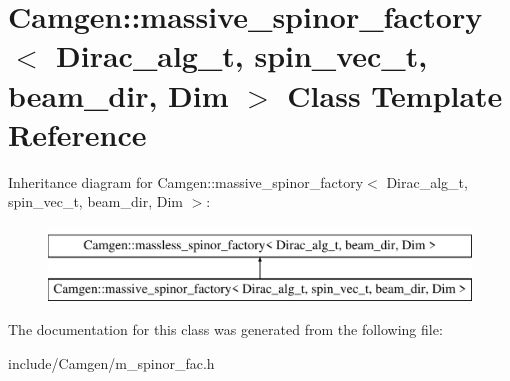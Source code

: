 \hypertarget{a00343}{\section{Camgen\-:\-:massive\-\_\-spinor\-\_\-factory$<$ Dirac\-\_\-alg\-\_\-t, spin\-\_\-vec\-\_\-t, beam\-\_\-dir, Dim $>$ Class Template Reference}
\label{a00343}
}
Inheritance diagram for Camgen\-:\-:massive\-\_\-spinor\-\_\-factory$<$ Dirac\-\_\-alg\-\_\-t, spin\-\_\-vec\-\_\-t, beam\-\_\-dir, Dim $>$\-:\begin{figure}[H]
\begin{center}
\leavevmode
\includegraphics[height=2.000000cm]{a00343}
\end{center}
\end{figure}


The documentation for this class was generated from the following file\-:\begin{DoxyCompactItemize}
\item 
include/\-Camgen/m\-\_\-spinor\-\_\-fac.\-h\end{DoxyCompactItemize}
